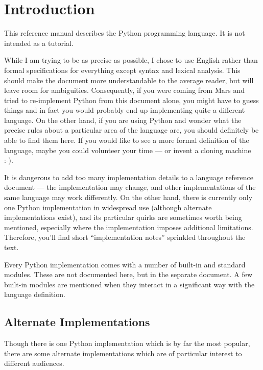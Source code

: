 \chapter{Introduction\label{introduction}}

This reference manual describes the Python programming language.
It is not intended as a tutorial.

While I am trying to be as precise as possible, I chose to use English
rather than formal specifications for everything except syntax and
lexical analysis.  This should make the document more understandable
to the average reader, but will leave room for ambiguities.
Consequently, if you were coming from Mars and tried to re-implement
Python from this document alone, you might have to guess things and in
fact you would probably end up implementing quite a different language.
On the other hand, if you are using
Python and wonder what the precise rules about a particular area of
the language are, you should definitely be able to find them here.
If you would like to see a more formal definition of the language,
maybe you could volunteer your time --- or invent a cloning machine
:-).

It is dangerous to add too many implementation details to a language
reference document --- the implementation may change, and other
implementations of the same language may work differently.  On the
other hand, there is currently only one Python implementation in
widespread use (although alternate implementations exist), and
its particular quirks are sometimes worth being mentioned, especially
where the implementation imposes additional limitations.  Therefore,
you'll find short ``implementation notes'' sprinkled throughout the
text.

Every Python implementation comes with a number of built-in and
standard modules.  These are not documented here, but in the separate
 document.  A few
built-in modules are mentioned when they interact in a significant way
with the language definition.


\section{Alternate Implementations\label{implementations}}

Though there is one Python implementation which is by far the most
popular, there are some alternate implementations which are of
particular interest to different audiences.

